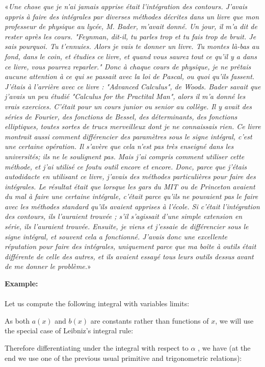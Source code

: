 	«\textit{Une chose que je n'ai jamais apprise était l'intégration des contours. J'avais appris à faire des intégrales par diverses méthodes décrites dans un livre que mon professeur de physique au lycée, M. Bader, m'avait donné. Un jour, il m'a dit de rester après les cours. "Feynman, dit-il, tu parles trop et tu fais trop de bruit. Je sais pourquoi. Tu t'ennuies. Alors je vais te donner un livre. Tu montes là-bas au fond, dans le coin, et étudies ce livre, et quand vous saurez tout ce qu'il y a dans ce livre, vous pourrez reparler." Donc à chaque cours de physique, je ne prêtais aucune attention à ce qui se passait avec la loi de Pascal, ou quoi qu'ils fassent. J'étais à l'arrière avec ce livre : "Advanced Calculus", de Woods. Bader savait que j'avais un peu étudié "Calculus for the Practital Man", alors il m'a donné les vrais exercices. C'était pour un cours junior ou senior au collège. Il y avait des séries de Fourier, des fonctions de Bessel, des déterminants, des fonctions elliptiques, toutes sortes de trucs merveilleux dont je ne connaissais rien. Ce livre montrait aussi comment différencier des paramètres sous le signe intégral, c'est une certaine opération. Il s'avère que cela n'est pas très enseigné dans les universités; ils ne le soulignent pas. Mais j'ai compris comment utiliser cette méthode, et j'ai utilisé ce foutu outil encore et encore. Donc, parce que j'étais autodidacte en utilisant ce livre, j'avais des méthodes particulières pour faire des intégrales. Le résultat était que lorsque les gars du MIT ou de Princeton avaient du mal à faire une certaine intégrale, c'était parce qu'ils ne pouvaient pas le faire avec les méthodes standard qu'ils avaient apprises à l'école. Si c'était l'intégration des contours, ils l'auraient trouvée ; s'il s'agissait d'une simple extension en série, ils l'auraient trouvée. Ensuite, je viens et j'essaie de différencier sous le signe intégral, et souvent cela a fonctionné. J'avais donc une excellente réputation pour faire des intégrales, uniquement parce que ma boîte à outils était différente de celle des autres, et ils avaient essayé tous leurs outils dessus avant de me donner le problème.}»
	
	
	\begin{tcolorbox}[colframe=black,colback=white,sharp corners]
	\textbf{{\Large {}}Example:}\\\\
	Let us compute the following integral with variables limits:
	
	As both $a(x)$ and $b(x)$ are constants rather than functions of $x$, we will use the special case of Leibniz's integral rule:
	
	Therefore differentiating under the integral with respect to $\alpha$ , we have (at the end we use one of the previous usual primitive and trigonometric relations):
	
	\end{tcolorbox}
	
